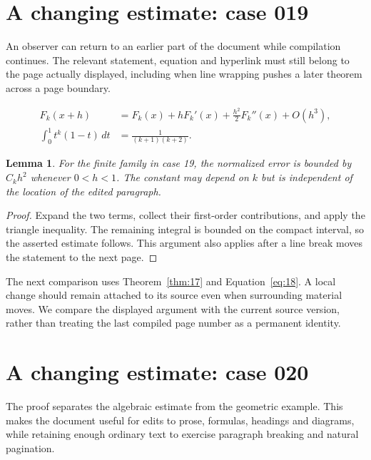 \documentclass[a4paper,10pt]{article}
\newtheorem{lemma}[theorem]{Lemma}
\begin{document}
\lipsum[13]

\section{A changing estimate: case 019}\label{unit:18}
An observer can return to an earlier part of the document while compilation continues. The relevant statement, equation and hyperlink must still belong to the page actually displayed, including when line wrapping pushes a later theorem across a page boundary.

\lipsum[25-26]
\begin{align}\label{eq:18}
 F_k(x+h)&=F_k(x)+hF_k'(x)+\frac{h^2}{2}F_k''(x)+O(h^3),\\
 \int_0^1 t^k(1-t)\,dt&=\frac{1}{(k+1)(k+2)}.
\end{align}
\begin{lemma}\label{thm:18}
For the finite family in case 19, the normalized error is bounded by $C_k h^2$ whenever $0<h<1$. The constant may depend on $k$ but is independent of the location of the edited paragraph.
\end{lemma}
\begin{proof}
Expand the two terms, collect their first-order contributions, and apply the
triangle inequality. The remaining integral is bounded on the compact interval,
so the asserted estimate follows. This argument also applies after a line break
moves the statement to the next page.
\end{proof}
The next comparison uses Theorem~\ref{thm:17} and Equation~\ref{eq:18}. A local change should remain attached to its source even when surrounding material moves. We compare the displayed argument with the current source version, rather than treating the last compiled page number as a permanent identity.

\lipsum[18]

\section{A changing estimate: case 020}\label{unit:19}
The proof separates the algebraic estimate from the geometric example. This makes the document useful for edits to prose, formulas, headings and diagrams, while retaining enough ordinary text to exercise paragraph breaking and natural pagination.
\end{document}
